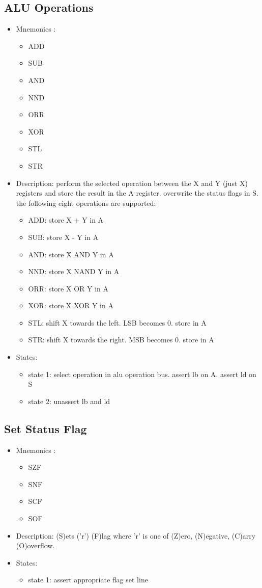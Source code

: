 \documentclass[a4paper,12pt]{article}
\begin{document}
\subsection{ALU Operations}
\begin{itemize}
\item Mnemonics :
\begin{itemize}
	\item ADD
	\item SUB
	\item AND
	\item NND
	\item ORR
	\item XOR
	\item STL
	\item STR
\end{itemize}
\item Description: perform the selected operation between the X and Y (just X) registers and store the result in the A register. overwrite the status flags in S. the following eight operations are supported:
\begin{itemize}
	\item ADD: store X + Y in A
	\item SUB: store X - Y in A
	\item AND: store X AND Y in A
	\item NND: store X NAND Y in A
	\item ORR: store X OR Y in A
	\item XOR: store X XOR Y in A
	\item STL: shift X towards the left. LSB becomes 0. store in A
	\item STR: shift X towards the right. MSB becomes 0. store in A
\end{itemize}
\item States: 
\begin{itemize}
	\item state 1: select operation in alu operation bus. assert lb on A. assert ld on S
	\item state 2: unassert lb and ld
\end{itemize}
\end{itemize}

\subsection{Set Status Flag}
\begin{itemize}
\item Mnemonics :
\begin{itemize}
	\item SZF
	\item SNF
	\item SCF
	\item SOF
\end{itemize}
\item Description: (S)ets ('r') (F)lag where 'r' is one of (Z)ero, (N)egative, (C)arry (O)overflow.
\item States:
\begin{itemize}
	\item state 1: assert appropriate flag set line
\end{itemize}
\end{itemize}
\end{document}

